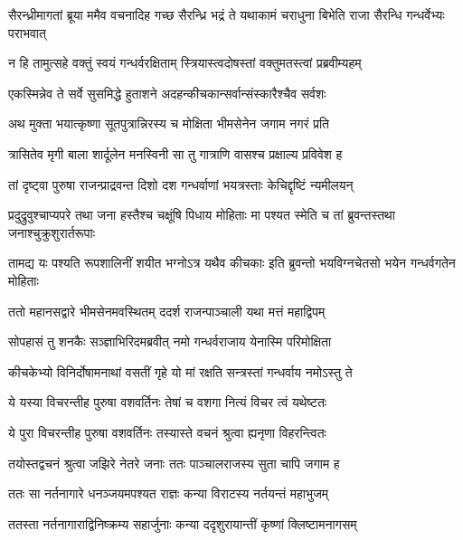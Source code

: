 \threelineshloka
{सैरन्ध्रीमागतां ब्रूया ममैव वचनादिह}
{गच्छ सैरन्ध्रि भद्रं ते यथाकामं चराधुना}
{बिभेति राजा सैरन्धि गन्धर्वेभ्यः पराभवात्}


\twolineshloka
{न हि तामुत्सहे वक्तुं स्वयं गन्धर्वरक्षिताम्}
{स्त्रियास्त्वदोषस्तां वक्तुमतस्त्वां प्रब्रवीम्यहम्}



\twolineshloka
{एकस्मिन्नेव ते सर्वे सुसमिद्धे हुताशने}
{अदहन्कीचकान्सर्वान्संस्कारैश्चैव सर्वशः}


\twolineshloka
{अथ मुक्ता भयात्कृष्णा सूतपुत्रान्निरस्य च}
{मोक्षिता भीमसेनेन जगाम नगरं प्रति}


\twolineshloka
{त्रासितेव मृगी बाला शार्दूलेन मनस्विनी}
{सा तु गात्राणि वासश्च प्रक्षाल्य प्रविवेश ह}


\twolineshloka
{तां दृष्ट्वा पुरुषा राजन्प्राद्रवन्त दिशो दश}
{गन्धर्वाणां भयत्रस्ताः केचिद्दृष्टिं न्यमीलयन्}


\twolineshloka
{प्रदुद्रुवुश्चाप्यपरे तथा जना हस्तैश्च चक्षूंषि पिधाय मोहिताः}
{मा पश्यत स्मेति च तां ब्रुवन्तस्तथा जनाश्चुक्रुशुरार्तरूपाः}


\twolineshloka
{तामद्य यः पश्यति रूपशालिनीं शयीत भग्नोऽत्र यथैव कीचकाः}
{इति ब्रुवन्तो भयविग्नचेतसो भयेन गन्धर्वगतेन मोहिताः}


\twolineshloka
{ततो महानसद्वारे भीमसेनमवस्थितम्}
{ददर्श राजन्पाञ्चाली यथा मत्तं महाद्विपम्}


\twolineshloka
{सोपहासं तु शनकैः सञ्ज्ञाभिरिदमब्रवीत्}
{नमो गन्धर्वराजाय येनास्मि परिमोक्षिता}


\twolineshloka
{कीचकेभ्यो विनिर्दोषामनाथां वसतीं गृहे}
{यो मां रक्षति सन्त्रस्तां गन्धर्वाय नमोऽस्तु ते}




\twolineshloka
{ये यस्या विचरन्तीह पुरुषा वशवर्तिनः}
{तेषां च वशगा नित्यं विचर त्वं यथेष्टतः}


\twolineshloka
{ये पुरा विचरन्तीह पुरुषा वशवर्तिनः}
{तस्यास्ते वचनं श्रुत्वा ह्यनृणा विहरन्त्वितः}



\twolineshloka
{तयोस्तद्वचनं श्रुत्वा जझिरे नेतरे जनाः}
{ततः पाञ्चालराजस्य सुता चापि जगाम ह}


\twolineshloka
{ततः सा नर्तनागारे धनञ्जयमपश्यत}
{राज्ञः कन्या विराटस्य नर्तयन्तं महाभुजम्}


\twolineshloka
{ततस्ता नर्तनागाराद्विनिष्क्रम्य सहार्जुनाः}
{कन्या ददृशुरायान्तीं कृष्णां क्लिष्टामनागसम्}

